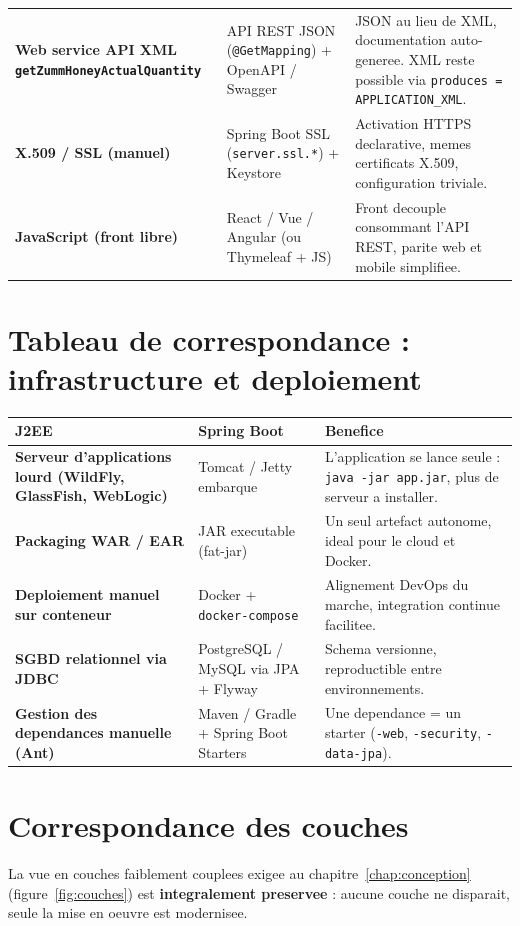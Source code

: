 \begin{xltabular}{\textwidth}{>{\bfseries}p{3cm} p{3.4cm} X}
Web service API XML \texttt{getZumm\allowbreak Honey\allowbreak Actual\allowbreak Quantity} & API REST JSON (\texttt{@GetMapping}) + OpenAPI / Swagger & JSON au lieu de XML, documentation auto-generee. XML reste possible via \texttt{produces = APPLICATION\_XML}. \\
X.509 / SSL (manuel) & Spring Boot SSL (\texttt{server.ssl.*}) + Keystore & Activation HTTPS declarative, memes certificats X.509, configuration triviale. \\
JavaScript (front libre) & React / Vue / Angular (ou Thymeleaf + JS) & Front decouple consommant l'API REST, parite web et mobile simplifiee. \\
\bottomrule
\end{xltabular}

\section{Tableau de correspondance : infrastructure et deploiement}
\begin{xltabular}{\textwidth}{>{\bfseries}p{4cm} p{4.5cm} X}
\toprule
\textbf{J2EE} & \textbf{Spring Boot} & \textbf{Benefice} \\
\midrule
\endhead
Serveur d'applications lourd (WildFly, GlassFish, WebLogic) & Tomcat / Jetty embarque & L'application se lance seule : \texttt{java -jar app.jar}, plus de serveur a installer. \\
Packaging WAR / EAR & JAR executable (fat-jar) & Un seul artefact autonome, ideal pour le cloud et Docker. \\
Deploiement manuel sur conteneur & Docker + \texttt{docker-compose} & Alignement DevOps du marche, integration continue facilitee. \\
SGBD relationnel via JDBC & PostgreSQL / MySQL via JPA + Flyway & Schema versionne, reproductible entre environnements. \\
Gestion des dependances manuelle (Ant) & Maven / Gradle + Spring Boot Starters & Une dependance = un starter (\texttt{-web}, \texttt{-security}, \texttt{-data-jpa}). \\
\bottomrule
\end{xltabular}

\section{Correspondance des couches}
La vue en couches faiblement couplees exigee au chapitre~\ref{chap:conception}
(figure~\ref{fig:couches}) est \textbf{integralement preservee} : aucune couche
ne disparait, seule la mise en oeuvre est modernisee.

